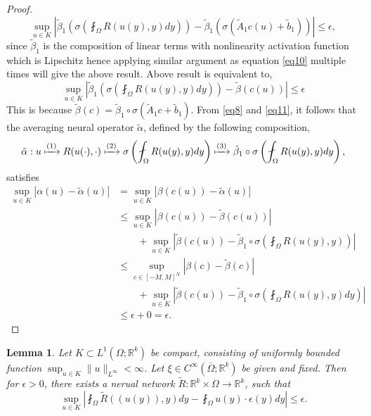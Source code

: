 \documentclass[reqno]{amsart}
\theoremstyle{plain}
\newtheorem{lem}{Lemma}
\theoremstyle{definition}
\newcommand{\bb}[1]{\mathbb{#1}}
\begin{document}
\begin{proof}
    $$ \sup_{u \in K} \left|\tilde{\beta}_1\left(\sigma\left(\fint_\Omega R(u(y),y) dy\right)\right) - \tilde{\beta}_1\left(\sigma\left(\tilde{A}_1 c(u) + \tilde{b}_1\right)\right)\right| \leq \epsilon,$$
    since $\tilde{\beta}_1$ is the composition of linear terms with nonlinearity activation function which is Lipschitz hence applying similar argument as equation \ref{eq10} multiple times will give the above result. Above result is equivalent to,
    \begin{equation}\label{eq11}
        \sup_{u \in K} \left|\tilde{\beta}_1\left(\sigma\left(\fint_\Omega R(u(y),y) dy\right)\right) - \tilde{\beta}\left(c(u)\right)\right| \leq \epsilon
    \end{equation}
    This is because $\tilde{\beta}(c) = \tilde{\beta}_1 \circ \sigma(\tilde{A}_1 c + \tilde{b}_1)$. From \ref{eq8} and \ref{eq11}, it follows that the averaging neural operator $\tilde{\alpha}$, defined by the following composition,
    \begin{equation}
        \tilde{\alpha}:u \xmapsto{(1)} R(u(\cdot),\cdot) \xmapsto{(2)} \sigma\left(\fint_\Omega R(u(y),y) dy\right) \xmapsto{(3)} \tilde{\beta}_1 \circ \sigma\left(\fint_\Omega R(u(y),y) dy\right),
    \end{equation}
    satisfies
    $$
    \begin{aligned}
        \sup_{u \in K} |\alpha(u) - \tilde{\alpha}(u)| &= \sup_{u \in K}|\beta(c(u)) - \tilde{\alpha}(u)|\\
        &\leq \sup_{u \in K}|\beta(c(u)) - \tilde{\beta}(c(u))|\\
        &\qquad + \sup_{u \in K}\left|\tilde{\beta}(c(u)) - \tilde{\beta}_1 \circ \sigma \left(\fint_\Omega R(u(y),y) \right) \right|\\
        &\leq \sup_{c\in [-M,M]^N} |\beta(c) - \tilde{\beta}(c)| \\
        & \qquad + \sup_{u \in K} \left|\tilde{\beta}(c(u)) - \tilde{\beta}_1 \circ \sigma \left(\fint_\Omega R(u(y),y) dy\right)\right|\\
        &\leq \epsilon + 0 = \epsilon.
    \end{aligned}
    $$
\end{proof}
\begin{lem}\label{lem7}
    Let $K \subset L^1(\Omega; \bb R^k)$ be compact, consisting of uniformly bounded function $\sup_{u \in K} \|u\|_{L^\infty} < \infty$. Let $\xi \in C^\infty(\overline{\Omega};\bb R^k)$ be given and fixed. Then for $\epsilon>0$, there exists a nerual network $\tilde{R} : \bb R^k \times \Omega \to \bb R^k$, such that 
    $$ \sup_{u \in K}\left|\fint_\Omega \tilde{R}((u(y)),y) dy - \fint_\Omega u(y) \cdot \epsilon(y) dy \right| \leq \epsilon.$$
\end{lem}
\end{document}
